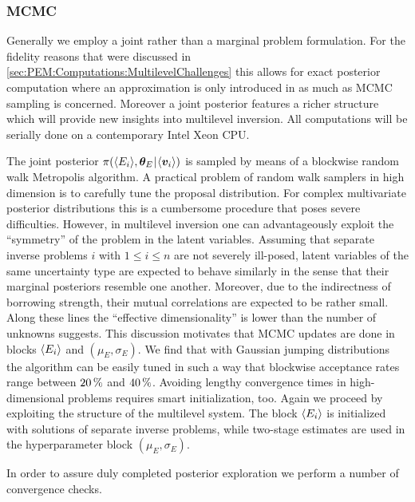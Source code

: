 \subsubsection{MCMC}
Generally we employ a joint rather than a marginal problem formulation.
For the fidelity reasons that were discussed in \cref{sec:PEM:Computations:MultilevelChallenges} this allows for exact posterior computation where an approximation is only introduced in as much as MCMC sampling is concerned.
Moreover a joint posterior features a richer structure which will provide new insights into multilevel inversion.
All computations will be serially done on a contemporary Intel Xeon CPU.
\par %
The joint posterior \(\pi(\langle{E_i}\rangle,\bm{\theta}_E {\:\!}|{\:\!} \langle{\bm{v}_i}\rangle)\) is sampled by means of a blockwise random walk Metropolis algorithm.
A practical problem of random walk samplers in high dimension is to carefully tune the proposal distribution.
For complex multivariate posterior distributions this is a cumbersome procedure that poses severe difficulties.
However, in multilevel inversion one can advantageously exploit the ``symmetry'' of the problem in the latent variables.
Assuming that separate inverse problems \(i\) with \(1 \leq i \leq n\) are not severely ill-posed, latent variables of the same uncertainty type are expected to behave similarly in the sense that their marginal posteriors resemble one another.
Moreover, due to the indirectness of borrowing strength, their mutual correlations are expected to be rather small.
Along these lines the ``effective dimensionality'' is lower than the number of unknowns suggests.
This discussion motivates that MCMC updates are done in blocks \(\langle{E_i}\rangle\) and \((\mu_E,\sigma_E)\).
We find that with Gaussian jumping distributions the algorithm can be easily tuned in such a way that blockwise acceptance rates range between \(\unit[20]{\%}\) and \(\unit[40]{\%}\).
Avoiding lengthy convergence times in high-dimensional problems requires smart initialization, too.
Again we proceed by exploiting the structure of the multilevel system.
The block \(\langle{E_i}\rangle\) is initialized with solutions of separate inverse problems, while two-stage estimates are used in the hyperparameter block \((\mu_E,\sigma_E)\).
\par %
In order to assure duly completed posterior exploration we perform a number of convergence checks.
